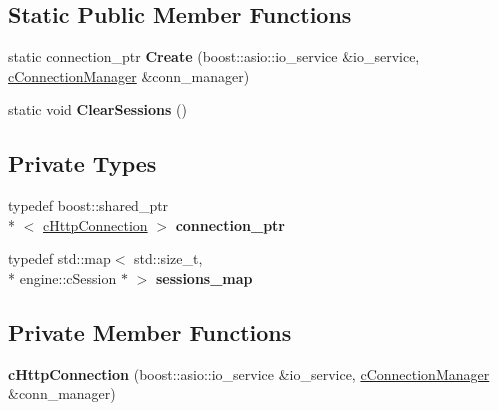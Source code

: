 \subsection*{Static Public Member Functions}
\begin{DoxyCompactItemize}
\item 
\hypertarget{classhttp__server_1_1cHttpConnection_a03b465f45c06bcc42c3a4e771ab00395}{static connection\-\_\-ptr {\bfseries Create} (boost\-::asio\-::io\-\_\-service \&io\-\_\-service, \hyperlink{classhttp__server_1_1cConnectionManager}{c\-Connection\-Manager} \&conn\-\_\-manager)}\label{classhttp__server_1_1cHttpConnection_a03b465f45c06bcc42c3a4e771ab00395}

\item 
\hypertarget{classhttp__server_1_1cHttpConnection_a233c74cfb8a64cfb93be34e2fca92741}{static void {\bfseries Clear\-Sessions} ()}\label{classhttp__server_1_1cHttpConnection_a233c74cfb8a64cfb93be34e2fca92741}

\end{DoxyCompactItemize}
\subsection*{Private Types}
\begin{DoxyCompactItemize}
\item 
\hypertarget{classhttp__server_1_1cHttpConnection_a0a5b09ba857189a7f7179096fdb15c09}{typedef boost\-::shared\-\_\-ptr\\*
$<$ \hyperlink{classhttp__server_1_1cHttpConnection}{c\-Http\-Connection} $>$ {\bfseries connection\-\_\-ptr}}\label{classhttp__server_1_1cHttpConnection_a0a5b09ba857189a7f7179096fdb15c09}

\item 
\hypertarget{classhttp__server_1_1cHttpConnection_a9397e5ddda8ff786ce54e693268778bc}{typedef std\-::map$<$ std\-::size\-\_\-t, \\*
engine\-::c\-Session $\ast$ $>$ {\bfseries sessions\-\_\-map}}\label{classhttp__server_1_1cHttpConnection_a9397e5ddda8ff786ce54e693268778bc}

\end{DoxyCompactItemize}
\subsection*{Private Member Functions}
\begin{DoxyCompactItemize}
\item 
\hypertarget{classhttp__server_1_1cHttpConnection_a8b0305459f933592f64fab2e3289dd54}{{\bfseries c\-Http\-Connection} (boost\-::asio\-::io\-\_\-service \&io\-\_\-service, \hyperlink{classhttp__server_1_1cConnectionManager}{c\-Connection\-Manager} \&conn\-\_\-manager)}\label{classhttp__server_1_1cHttpConnection_a8b0305459f933592f64fab2e3289dd54}

\end{DoxyCompactItemize}

